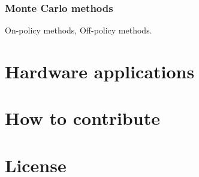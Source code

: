 \documentclass{book}
\begin{document}
\subsection{Monte Carlo methods}

On-policy methods, Off-policy methods.



\chapter{Hardware applications}


\chapter{How to contribute}

\chapter{License}
\end{document}
